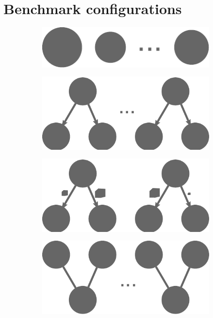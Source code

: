 \chapter{Benchmark configurations}
\begin{figure}[h]
	\centering
	\begin{subfigure}{.2\textwidth}
		\centering
		\includegraphics[width=.8\textwidth]{imgs/estee/shapes/plain}
		\caption{}
		\label{fig:tg-plain}
	\end{subfigure}%
	\begin{subfigure}{.2\textwidth}
		\centering
		\includegraphics[width=.8\linewidth]{imgs/estee/shapes/fork}
		\caption{}
		\label{fig:tg-fork}
	\end{subfigure}
	\begin{subfigure}{.2\textwidth}
		\centering
		\includegraphics[width=.8\linewidth]{imgs/estee/shapes/fork2}
		\caption{}
		\label{fig:tg-fork2}
	\end{subfigure}
	\begin{subfigure}{.2\textwidth}
		\centering
		\includegraphics[width=.8\linewidth]{imgs/estee/shapes/v}

\end{subfigure}
\end{figure}
